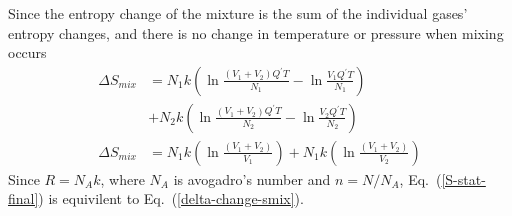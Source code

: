 \documentclass[a4paper]{article}
\newcommand{\eref}[1]{Eq.~(\ref{#1})}
\begin{document}
\begin{enumerate}
    Since the entropy change of the mixture is the sum of the individual gases'
    entropy changes, and there is no change in temperature or pressure when
    mixing occurs
    \begin{equation}
      \begin{aligned}
        \Delta S_{mix} &= 
        N_1 k\left( \ln \frac{(V_1+V_2)Q^{'}T}{N_1} - \ln
        \frac{V_1 Q^{'}T}{N_1} \right) \\
        &+ N_2 k\left( \ln \frac{(V_1+V_2)Q^{'}T}{N_2} - \ln
        \frac{V_2 Q^{'}T}{N_2} \right) \\
        \Delta S_{mix} &= 
        N_1 k\left( \ln \frac{(V_1+V_2)}{V_1} \right)
        + N_1 k\left( \ln \frac{(V_1+V_2)}{V_2} \right)
      \end{aligned}
      \label{S-stat-final}
    \end{equation}
    Since $R=N_A k$, where $N_A$ is avogadro's number and $n = N/N_A$,
    \eref{S-stat-final} is equivilent to \eref{delta-change-smix}.


\end{enumerate}
\end{document}
